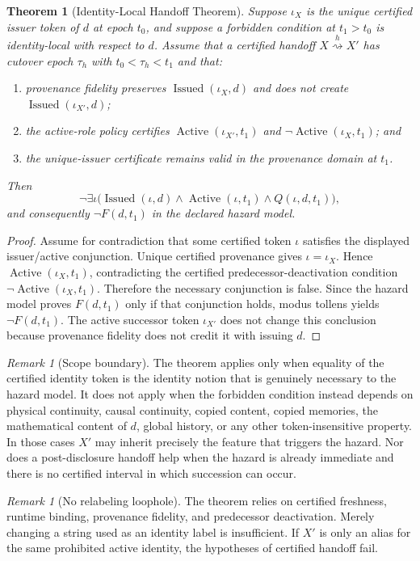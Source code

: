 \documentclass[11pt]{article}
\newtheorem{theorem}[definition]{Theorem}
\theoremstyle{remark}
\newtheorem{remark}[definition]{Remark}
\newcommand{\Issued}{\operatorname{Issued}}
\newcommand{\Active}{\operatorname{Active}}
\newcommand{\handoff}{\mathrel{\overset{h}{\rightsquigarrow}}}
\begin{document}
\begin{theorem}[Identity-Local Handoff Theorem]
Suppose $\iota_X$ is the unique certified issuer token of $d$ at epoch $t_0$, and suppose a forbidden condition at $t_1>t_0$ is identity-local with respect to $d$. Assume that a certified handoff $X\handoff X'$ has cutover epoch $\tau_h$ with $t_0<\tau_h<t_1$ and that:
\begin{enumerate}[label=(\roman*)]
\item provenance fidelity preserves $\Issued(\iota_X,d)$ and does not create $\Issued(\iota_{X'},d)$;
\item the active-role policy certifies $\Active(\iota_{X'},t_1)$ and $\neg\Active(\iota_X,t_1)$; and
\item the unique-issuer certificate remains valid in the provenance domain at $t_1$.
\end{enumerate}
Then
\[
\neg\exists \iota\bigl(\Issued(\iota,d)\land\Active(\iota,t_1)\land Q(\iota,d,t_1)\bigr),
\]
and consequently $\neg F(d,t_1)$ in the declared hazard model.
\end{theorem}
\begin{proof}
Assume for contradiction that some certified token $\iota$ satisfies the displayed issuer/active conjunction. Unique certified provenance gives $\iota=\iota_X$. Hence $\Active(\iota_X,t_1)$, contradicting the certified predecessor-deactivation condition $\neg\Active(\iota_X,t_1)$. Therefore the necessary conjunction is false. Since the hazard model proves $F(d,t_1)$ only if that conjunction holds, modus tollens yields $\neg F(d,t_1)$. The active successor token $\iota_{X'}$ does not change this conclusion because provenance fidelity does not credit it with issuing $d$.
\end{proof}

\begin{remark}[Scope boundary]
The theorem applies only when equality of the certified identity token is the identity notion that is genuinely necessary to the hazard model. It does not apply when the forbidden condition instead depends on physical continuity, causal continuity, copied content, copied memories, the mathematical content of $d$, global history, or any other token-insensitive property. In those cases $X'$ may inherit precisely the feature that triggers the hazard. Nor does a post-disclosure handoff help when the hazard is already immediate and there is no certified interval in which succession can occur.
\end{remark}

\begin{remark}[No relabeling loophole]
The theorem relies on certified freshness, runtime binding, provenance fidelity, and predecessor deactivation. Merely changing a string used as an identity label is insufficient. If $X'$ is only an alias for the same prohibited active identity, the hypotheses of certified handoff fail.
\end{remark}
\end{document}

